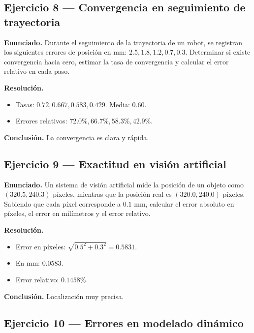 \documentclass[12pt,a4paper]{report}
\begin{document}
	\subsection*{Ejercicio 8 --- Convergencia en seguimiento de trayectoria}
	
	\textbf{Enunciado.} Durante el seguimiento de la trayectoria de un robot, se registran los siguientes errores de posición en mm: $2.5, 1.8, 1.2, 0.7, 0.3$. Determinar si existe convergencia hacia cero, estimar la tasa de convergencia y calcular el error relativo en cada paso.
	
	\textbf{Resolución.}
	\begin{itemize}
		\item Tasas: $0.72, 0.667, 0.583, 0.429$. Media: $0.60$.
		\item Errores relativos: $72.0\%, 66.7\%, 58.3\%, 42.9\%$.
	\end{itemize}
	
	\textbf{Conclusión.} La convergencia es clara y rápida.
	
	\subsection*{Ejercicio 9 --- Exactitud en visión artificial}
	
	\textbf{Enunciado.} Un sistema de visión artificial mide la posición de un objeto como $(320.5,240.3)$ píxeles, mientras que la posición real es $(320.0,240.0)$ píxeles. Sabiendo que cada píxel corresponde a $0.1$ mm, calcular el error absoluto en píxeles, el error en milímetros y el error relativo.
	
	\textbf{Resolución.}
	\begin{itemize}
		\item Error en píxeles: $\sqrt{0.5^2+0.3^2}=0.5831$.
		\item En mm: $0.0583$.
		\item Error relativo: $0.1458\%$.
	\end{itemize}
	
	\textbf{Conclusión.} Localización muy precisa.
	
	\subsection*{Ejercicio 10 --- Errores en modelado dinámico}
	
\end{document}
